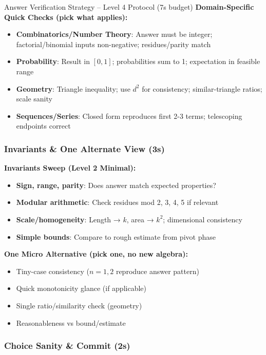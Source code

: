\documentclass{article}
\begin{document}
\begin{classifybox}{Answer Verification Strategy -- Level 4 Protocol (7s budget)}
\textbf{Domain-Specific Quick Checks (pick what applies):}
\begin{itemize}[nosep]
\item \textbf{Combinatorics/Number Theory}: Answer must be integer; factorial/binomial inputs non-negative; residues/parity match
\item \textbf{Probability}: Result in $[0,1]$; probabilities sum to 1; expectation in feasible range  
\item \textbf{Geometry}: Triangle inequality; use $d^2$ for consistency; similar-triangle ratios; scale sanity
\item \textbf{Sequences/Series}: Closed form reproduces first 2-3 terms; telescoping endpoints correct
\end{itemize}

\subsubsection{Invariants \& One Alternate View (3s)}
{\footnotesize\textcolor{timegreen}{}}

\textbf{Invariants Sweep (Level 2 Minimal):}
\begin{itemize}[nosep]
\item \textbf{Sign, range, parity}: Does answer match expected properties?
\item \textbf{Modular arithmetic}: Check residues mod 2, 3, 4, 5 if relevant
\item \textbf{Scale/homogeneity}: Length → $k$, area → $k^2$; dimensional consistency
\item \textbf{Simple bounds}: Compare to rough estimate from pivot phase
\end{itemize}

\textbf{One Micro Alternative (pick one, no new algebra):}
\begin{itemize}[nosep]
\item Tiny-case consistency ($n=1,2$ reproduce answer pattern)
\item Quick monotonicity glance (if applicable)
\item Single ratio/similarity check (geometry)
\item Reasonableness vs bound/estimate
\end{itemize}

\subsubsection{Choice Sanity \& Commit (2s)}
{\footnotesize\textcolor{timegreen}{}}


\end{classifybox}
\end{document}
